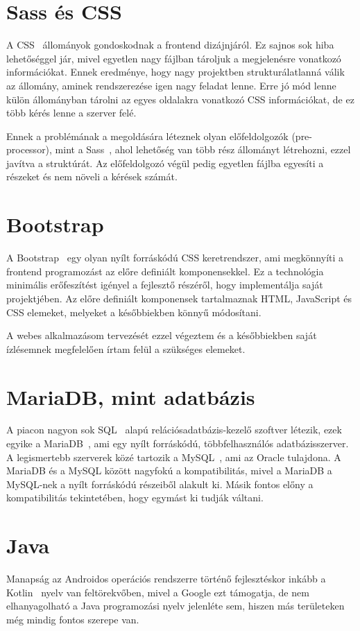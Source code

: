 \documentclass[
]{thesis-ekf}
\theoremstyle{definition}
\theoremstyle{remark}
\begin{document}
	\section{Sass és CSS}
	A CSS~\cite{css_doc} állományok gondoskodnak a frontend dizájnjáról. Ez sajnos sok hiba lehetőséggel jár, mivel egyetlen nagy fájlban tároljuk a megjelenésre vonatkozó információkat. Ennek eredménye, hogy nagy projektben strukturálatlanná válik az állomány, aminek rendszerezése igen nagy feladat lenne. Erre jó mód lenne külön állományban tárolni az egyes oldalakra vonatkozó CSS információkat, de ez több kérés lenne a szerver felé. 
	
	Ennek a problémának a megoldására léteznek olyan előfeldolgozók (pre-processor), mint a Sass~\cite{sass_doc}, ahol lehetőség van több rész állományt létrehozni, ezzel javítva a struktúrát. Az előfeldolgozó végül pedig egyetlen fájlba egyesíti a részeket és nem növeli a kérések számát. 
	
	\section{Bootstrap}
	A Bootstrap~\cite{bootstrap_doc} egy olyan nyílt forráskódú CSS keretrendszer, ami megkönnyíti a frontend programozást az előre definiált komponensekkel. Ez a technológia minimális erőfeszítést igényel a fejlesztő részéről, hogy implementálja saját projektjében. Az előre definiált komponensek tartalmaznak HTML, JavaScript és CSS elemeket, melyeket a későbbiekben könnyű módosítani.
	
	A webes alkalmazásom tervezését ezzel végeztem és a későbbiekben saját ízlésemnek megfelelően írtam felül a szükséges elemeket. 
	
	\section{MariaDB, mint adatbázis}
	A piacon nagyon sok SQL~\cite{sql_book} alapú relációsadatbázis-kezelő szoftver létezik, ezek egyike a MariaDB~\cite{mariadb_doc}, ami egy nyílt forráskódú, többfelhasználós adatbázisszerver. A legismertebb szerverek közé tartozik a MySQL~\cite{mysql_book}, ami az Oracle tulajdona. A MariaDB és a MySQL között nagyfokú a kompatibilitás, mivel a MariaDB a MySQL-nek a nyílt forráskódú részeiből alakult ki. Másik fontos előny a kompatibilitás tekintetében, hogy egymást ki tudják váltani.
	
	\section{Java}
	Manapság az Androidos operációs rendszerre történő fejlesztéskor inkább a Kotlin~\cite{kotlin_book} nyelv van feltörekvőben, mivel a Google ezt támogatja, de nem elhanyagolható a Java programozási nyelv jelenléte sem, hiszen más területeken még mindig fontos szerepe van. 
	
\end{document}
